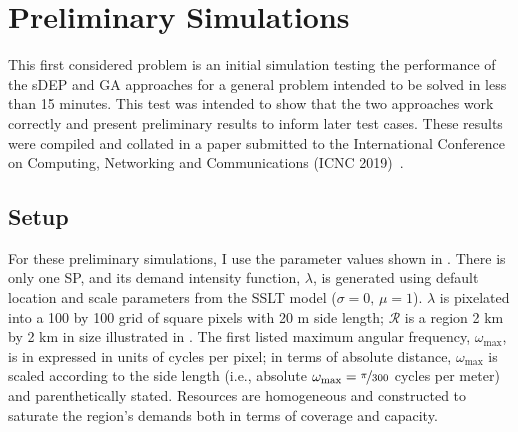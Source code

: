 \documentclass[12pt,dvipsnames]{report}
\begin{document}
\section{Preliminary Simulations} \label{sec:prelim}

This first considered problem is an initial simulation testing the performance of the sDEP and GA approaches for a general problem intended to be solved in less than 15 minutes.  This test was intended to show that the two approaches work correctly and present preliminary results to inform later test cases.  These results were compiled and collated in a paper submitted to the International Conference on Computing, Networking and Communications (ICNC 2019)~\cite{KTeague:BSSelection}.

\subsection{Setup} \label{subsec:prelim_setup}

For these preliminary simulations, I use the parameter values shown in .  There is only one SP, and its demand intensity function, $\lambda$, is generated using default location and scale parameters from the SSLT model ($\sigma = 0,\, \mu = 1$).  $\lambda$ is pixelated into a 100 by 100 grid of square pixels with 20 m side length; $\mathcal{R}$ is a region 2 km by 2 km in size illustrated in .  The first listed maximum angular frequency, $\omega_{\max}$, is in expressed in units of cycles per pixel; in terms of absolute distance, $\omega_{\max}$ is scaled according to the side length (i.e., absolute $\omega_{\max} = \nicefrac{\pi}{300}$ cycles per meter) and parenthetically stated.  Resources are homogeneous and constructed to saturate the region's demands both in terms of coverage and capacity.
\end{document}
